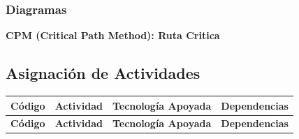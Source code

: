 \documentclass[letterpaper, 11pt]{report}
\begin{document}
\subsubsection{Diagramas}

\textbf{CPM (Critical Path Method): Ruta Critica}

\subsection{Asignación de Actividades}

\begin{longtable}{|c|p{.3\linewidth}|p{.3\linewidth}|p{.3\linewidth}|}
      \hline

      \textbf{Código}                                                           & \textbf{Actividad}                     & \textbf{Tecnología Apoyada} & \textbf{Dependencias} \\
      \hline
      \endfirsthead

      \hline

      \textbf{Código}                                                           & \textbf{Actividad}                     & \textbf{Tecnología Apoyada} & \textbf{Dependencias} \\
      \hline
      \endhead


\end{longtable}
\end{document}
